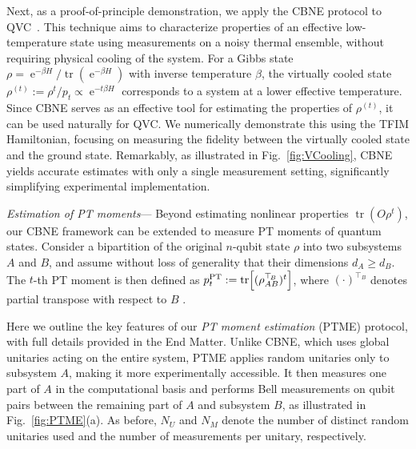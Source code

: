 \documentclass[aps,prl,twocolumn,nofootinbib,superscriptaddress,10pt]{revtex4-2}
\let\originalleft\left
\let\originalright\right
\renewcommand{\left}{\mathopen{}\mathclose\bgroup\originalleft}
\renewcommand{\right}{\aftergroup\egroup\originalright}
\DeclareMathOperator{\Tr}{tr}
\theoremstyle{plain}
\theoremstyle{definition}
\newcommand{\PT}{\mathrm{PT}}
\newcommand{\rme}{\operatorname{e}}
\begin{document}
Next, as a proof-of-principle demonstration, we apply the CBNE protocol to QVC~\cite{PhysRevX.9.031013,du2025optimal}. This technique aims to characterize properties of an effective low-temperature state using measurements on a noisy thermal ensemble, without requiring physical cooling of the system. For a Gibbs state $\rho = \rme^{-\beta H}\!\!/\!\Tr(\rme^{-\beta H})$ with inverse temperature $\beta$, the virtually cooled state $\rho^{(t)}:=\rho^t/p_t \propto \rme^{-t\beta H}$
corresponds to a system at a lower effective temperature. Since CBNE serves as an effective tool for estimating the properties of $\rho^{(t)}$, it can be used naturally for QVC. We numerically demonstrate this using the TFIM Hamiltonian, focusing on measuring the fidelity between the virtually cooled state and the ground state. Remarkably, as illustrated in Fig.~\ref{fig:VCooling}, CBNE yields accurate estimates with only a single measurement setting, significantly simplifying experimental implementation.



\emph{Estimation of PT moments}---
Beyond estimating nonlinear properties $\Tr(O\rho^t)$, our CBNE framework can be extended to measure PT moments of quantum states.   
Consider a bipartition of the original $n$-qubit state $\rho$ into two subsystems $A$ and $B$, and assume without loss of generality that 
their dimensions $d_A \ge d_B$. 
The $t$-th PT moment is then defined as $p_t^{\PT}:=\Tr\left[(\rho_{AB}^{\top_{\! B}})^t\right]$, where $(\cdot)^{\top_{\! B}}$ denotes partial transpose with respect to $B$ \cite{PhysRevLett.121.150503,elben2020mixedstate,singlezhou}. 


Here we outline the key features of our \emph{PT moment estimation} (PTME) protocol, with full details provided in the End Matter.
Unlike CBNE, which uses global unitaries acting on the entire system, 
PTME applies random unitaries only to subsystem $A$, making it more experimentally accessible. 
It then measures one part of \(A\) in the computational basis and performs Bell measurements on qubit pairs between the remaining part of \(A\) and subsystem \(B\), as illustrated in Fig.~\ref{fig:PTME}(a).
As before, $N_U$ and $N_M$ denote the number of distinct random unitaries used and the number of measurements per unitary, respectively. 
\end{document}
